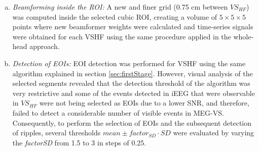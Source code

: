 \begin{enumerate}[(a)]
\item \textit{Beamforming inside the ROI:} A new and finer grid (0.75 cm between $VS_{HF}$) was computed inside the selected cubic ROI, creating a volume of $5 \times 5 \times 5$ points where new beamformer weights were calculated and time-series signals were obtained for each VSHF using the same procedure applied in the whole-head approach. 

\item \textit{Detection of EOIs:} EOI detection was performed for VSHF using the same algorithm explained in section \ref{sec:firstStage}. However, visual analysis of the selected segments revealed that the detection threshold of the algorithm was very restrictive and some of the events detected in iEEG that were observable in $VS_{HF}$ were not being selected as EOIs due to a lower SNR, and therefore, failed to detect a considerable number of visible events in MEG-VS. Consequently, to perform the selection of EOIs and the subsequent detection of ripples, several thresholds $ mean \pm factor_{SD} \cdot SD$ were evaluated by varying the \textit{factorSD} from 1.5 to 3 in steps of 0.25.


\end{enumerate}
